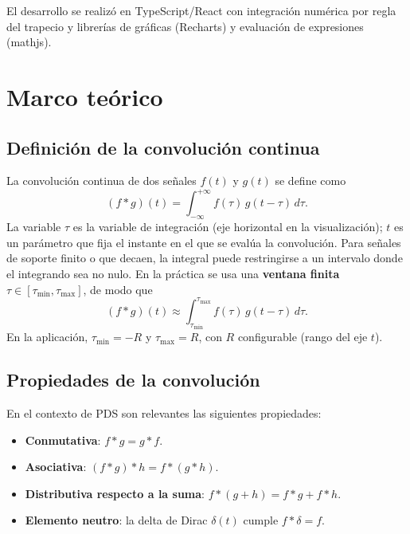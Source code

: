 \documentclass[12pt,a4paper]{article}
\begin{document}
El desarrollo se realizó en TypeScript/React con integración numérica por regla del trapecio y librerías de gráficas (Recharts) y evaluación de expresiones (mathjs).

\section{Marco teórico}

\subsection{Definición de la convolución continua}

La convolución continua de dos señales \(f(t)\) y \(g(t)\) se define como
\begin{equation}
  (f * g)(t) = \int_{-\infty}^{+\infty} f(\tau)\, g(t - \tau)\, d\tau.
  \label{eq:conv-def}
\end{equation}
La variable \(\tau\) es la variable de integración (eje horizontal en la visualización); \(t\) es un parámetro que fija el instante en el que se evalúa la convolución. Para señales de soporte finito o que decaen, la integral puede restringirse a un intervalo donde el integrando sea no nulo. En la práctica se usa una \textbf{ventana finita} \(\tau \in [\tau_{\min}, \tau_{\max}]\), de modo que
\begin{equation}
  (f * g)(t) \approx \int_{\tau_{\min}}^{\tau_{\max}} f(\tau)\, g(t - \tau)\, d\tau.
  \label{eq:conv-window}
\end{equation}
En la aplicación, \(\tau_{\min} = -R\) y \(\tau_{\max} = R\), con \(R\) configurable (rango del eje \(t\)).

\subsection{Propiedades de la convolución}

En el contexto de PDS son relevantes las siguientes propiedades:
\begin{itemize}
  \item \textbf{Conmutativa}: \(f * g = g * f\).
  \item \textbf{Asociativa}: \((f * g) * h = f * (g * h)\).
  \item \textbf{Distributiva respecto a la suma}: \(f * (g + h) = f * g + f * h\).
  \item \textbf{Elemento neutro}: la delta de Dirac \(\delta(t)\) cumple \(f * \delta = f\).
\end{itemize}
\end{document}
